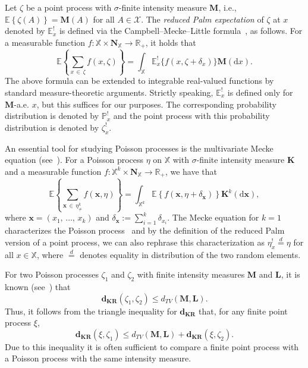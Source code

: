 \documentclass[10pt]{amsart}
\theoremstyle{definition}\newtheorem{defi}[theo]{Definition}\newtheorem{rema}[theo]{Remark}\newtheorem{exam}[theo]{Example}\newtheorem{exem}[theo]{Example}\newtheorem{nota}[theo]{Notation}
\newcommand*\bL{\mathbf{L}}
\newcommand*\bM{\mathbf{M}}
\newcommand*\bN{\mathbf{N}}
\newcommand*\bK{\mathbf{K}}
\newcommand{\bx}{\mathbf{x}}
\newcommand*\dkr{\mathbf{d_{KR}}}
\newcommand*\R{\mathbb{R}}
\renewcommand*\P{\mathbb{P}}
\newcommand*\X{\mathbb{X}}
\newcommand{\E}{\mathbb{E}}
\newcommand*\cX{\mathcal{X}}
\newcommand*\md{\mathrm{d}}
\newcommand{\mean}[1] {\E\left\{{#1}\right\}}
\newcommand*{\MK}{\mkern 2mu}
\begin{document}
Let $\zeta$ be a point process with $\sigma$-finite intensity measure $\bM$, i.e., $\mean{\zeta(A)}=\bM(A)$ for all $A\in\cX$. The {\em reduced Palm expectation} of $\zeta$ at $x$ denoted by $\E^{!}_{x}$ is defined via the Campbell--Mecke--Little formula~\cite[Corollary~3.1.14]{Baccelli2020}, as follows. For a measurable function $f : \X \times \bN_{\X} \to \R_+$, it holds that
\begin{equation}\label{e:clm}
\mean{\sum_{x\,\in\,\zeta} f(x,\zeta)} = \int_{\X}\E^{!}_{x}\big\{f\left(x,\zeta +\delta_{x}\right)\big\} \bM(\md x).
\end{equation}
The above formula can be extended to integrable real-valued functions by standard measure-theoretic arguments. Strictly speaking, $\E^{!}_{x}$ is defined only for $\bM$-a.e. $x$, but this suffices for our purposes. The corresponding probability distribution is denoted by $\P^{!}_{x}$ and the point process with this probability distribution is denoted by $\zeta^{!}_x$.

An essential tool for studying Poisson processes is the multivariate Mecke equation (see~\cite[Theorem~4.4]{LastPenrose17}). For a Poisson process $\eta$ on $\X$ with $\sigma$-finite intensity measure $\bK$ and a measurable function $f : \X^k \times \bN_{\X} \to \R_+$, we have that
\begin{equation}\label{e:mmecke}
\mean{\sum_{\bx\,\in\,\eta^k_{\ne}} f(\bx,\eta)} = \int_{\X^k}\mean{f\left(\bx,\eta+\delta_{\bx}\right)}\bK^k(\md \bx),
\end{equation}
where $\bx = (x_1,\,\ldots,\,x_k)$ and $\delta_{\bx} := \sum_{i=1}^k \delta_{x_i}$. The Mecke equation for $k = 1$ characterizes the Poisson process~\cite[Theorem~4.1]{LastPenrose17} and by the definition of the reduced Palm version of a point process, we can also rephrase this characterization as $\eta^{!}_x \stackrel{d}{=} \eta$ for all $x \in \X$, where $\stackrel{d}{=}$ denotes equality in distribution of the two random elements.

For two Poisson processes $\zeta_1$ and $\zeta_2$ with finite intensity measures $\bM$ and $\bL$, it is known (see~\cite[Remark~3.2$\MK$(iv)]{decreusefond_functional_2016}) that
\begin{equation}\label{e:dkrPoisson0}
\dkr(\zeta_1,\zeta_2)\leq d_{TV}(\bM,\bL).
\end{equation}
Thus, it follows from the triangle inequality for $\dkr$ that, for any finite point process $\xi$,
\begin{equation}\label{e:dkrPoisson}
\dkr(\xi,\zeta_1) \leq d_{TV}(\bM,\bL) + \dkr(\xi,\zeta_2).
\end{equation}
Due to this inequality it is often sufficient to compare a finite point process with a Poisson process with the same intensity measure.
\end{document}
